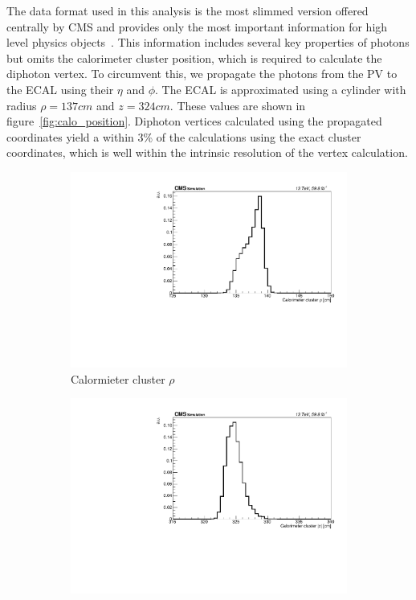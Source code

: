 The data format used in this analysis is the most slimmed version offered centrally by CMS and provides only the most important information for high level physics objects~\cite{nanoaod}. This information includes several key properties of photons but omits the calorimeter cluster position, which is required to calculate the diphoton vertex. To circumvent this, we propagate the photons from the PV to the ECAL using their $\eta$ and $\phi$. The ECAL is approximated using a cylinder with radius $\rho=137\unit{cm}$ and $z=324\unit{cm}$. These values are shown in figure~\ref{fig:calo_position}. Diphoton vertices calculated using the propagated coordinates yield a \lxy within 3\% of the \lxy calculations using the exact cluster coordinates, which is well within the intrinsic resolution of the vertex calculation.

\begin{figure}[htb!]
	\centering
	\captionsetup[subfigure]{justification=centering}
	\begin{subfigure}[h]{0.45\linewidth}
		\centering
		\includegraphics[width=\linewidth]{figs/05_analysis/calorimeter_rho.pdf}
		\caption{Calormieter cluster $\rho$}
	\end{subfigure}
	\begin{subfigure}[h]{0.45\linewidth}
		\centering
		\includegraphics[width=\linewidth]{figs/05_analysis/calorimeter_z.pdf}

\end{subfigure}
\end{figure}
